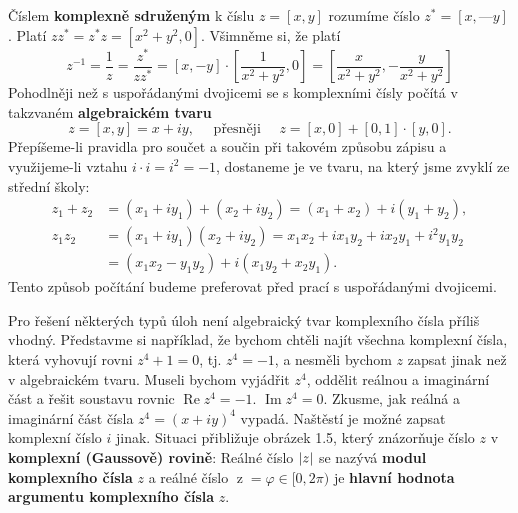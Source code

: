       Číslem \textbf{komplexně sdruženým} k číslu \(z = [x, y]\) rozumíme číslo \(z^* = [x, —y]\). 
      Platí \(zz^* = z^*z = [x^2 + y^2, 0]\). Všimněme si, že platí
      \begin{equation*}
        z^{-1} = \dfrac{1}{z} = \dfrac{z^*}{zz^*} = [x, -y]\cdot\left[\dfrac{1}{x^2+y^2}, 0\right]
               = \left[\dfrac{x}{x^2 + y^2}, -\dfrac{y}{x^2 + y^2} \right]
      \end{equation*}
      Pohodlněji než s uspořádanými dvojicemi se s komplexními čísly počítá v takzvaném 
      \textbf{algebraickém tvaru}
      \begin{equation*}
        z= [x ,y] = x + iy,\quad\text{ přesněji }\quad z = [x, 0] + [0, 1] \cdot [y, 0].
      \end{equation*}
      Přepíšeme-li pravidla pro součet a součin při takovém způsobu zápisu a využijeme-li vztahu 
      \(i \cdot i=i^2 = - 1\), dostaneme je ve tvaru, na který jsme zvyklí ze střední školy:
      \begin{align*}
        z_1 + z_2 &= (x_1 + iy_1) + (x_2 + iy_2) = (x_1 + x_2) + i(y_1 + y_2),     \\
        z_1z_2    &= (x_1 + iy_1)(x_2 + iy_2) = x_1x_2 + ix_1y_2 + ix_2y_1 + i^2y_1y_2  \\ 
                  &= (x_1x_2 - y_1y_2) + i(x_1y_2 + x_2y_1).
      \end{align*}
      Tento způsob počítání budeme preferovat před prací s uspořádanými dvojicemi. 
      
      
      
      Pro řešení některých typů úloh není algebraický tvar komplexního čísla příliš vhodný. 
      Představme si například, že bychom chtěli najít všechna komplexní čísla, která vyhovují rovni 
      \(z^4 + 1 = 0\), tj. \(z^4 = -1\), a nesměli bychom \(z\) zapsat jinak než v algebraickém 
      tvaru. Museli bychom vyjádřit \(z^4\), oddělit reálnou a imaginární část a řešit soustavu 
      rovnic \(\operatorname{Re}z^4 =-1\). \(\operatorname{Im}z^4 = 0\). Zkusme, jak reálná a 
      imaginární část čísla \(z^4 = (x + iy)^4\) vypadá. Naštěstí je možné zapsat komplexní číslo 
      \(i\) jinak. Situaci přibližuje obrázek 1.5, který znázorňuje číslo \(z\) v \textbf{komplexní 
      (Gaussově) rovině}: Reálné číslo \(\lvert z\rvert\) se nazývá \textbf{modul komplexního čísla} \(z\) 
      a reálné číslo \(\operatorname{z} = \varphi\in [0, 2\pi)\) je \textbf{hlavní hodnota 
      argumentu komplexního čísla} \(z\). 
      
